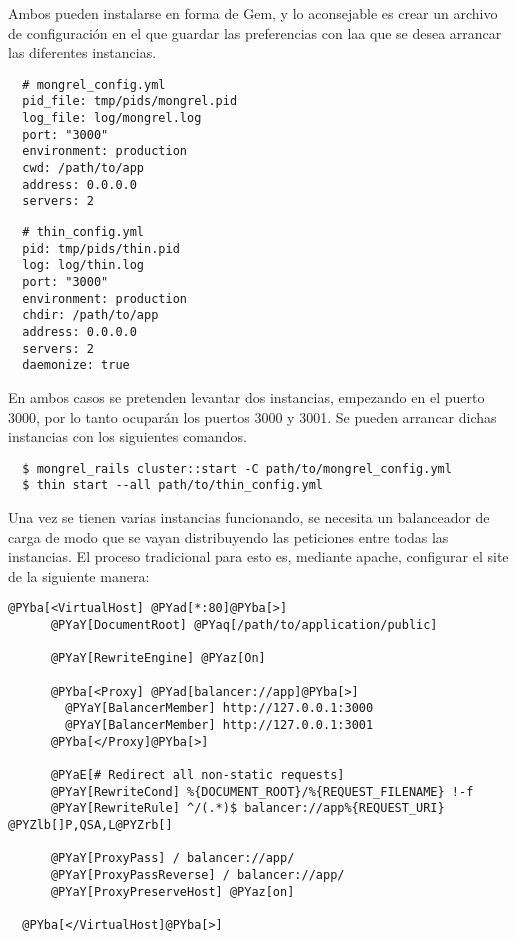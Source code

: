 Ambos pueden instalarse en forma de Gem, y lo aconsejable es crear un archivo de configuración en el que guardar las preferencias con laa que se desea arrancar las diferentes instancias.

\begin{verbatim}
  # mongrel_config.yml
  pid_file: tmp/pids/mongrel.pid
  log_file: log/mongrel.log
  port: "3000"
  environment: production
  cwd: /path/to/app
  address: 0.0.0.0
  servers: 2
\end{verbatim}

\begin{verbatim}
  # thin_config.yml
  pid: tmp/pids/thin.pid
  log: log/thin.log
  port: "3000"
  environment: production
  chdir: /path/to/app
  address: 0.0.0.0
  servers: 2
  daemonize: true
\end{verbatim}

En ambos casos se pretenden levantar dos instancias, empezando en el puerto 3000, por lo tanto ocuparán los puertos 3000 y 3001. Se pueden arrancar dichas instancias con los siguientes comandos.

\begin{verbatim}
  $ mongrel_rails cluster::start -C path/to/mongrel_config.yml
  $ thin start --all path/to/thin_config.yml
\end{verbatim}

Una vez se tienen varias instancias funcionando, se necesita un balanceador de carga de modo que se vayan distribuyendo las peticiones entre todas las instancias. El proceso tradicional para esto es, mediante apache, configurar el site de la siguiente manera:

\begin{Verbatim}[commandchars=@\[\]]
  @PYba[<VirtualHost] @PYad[*:80]@PYba[>]
      @PYaY[DocumentRoot] @PYaq[/path/to/application/public]
      
      @PYaY[RewriteEngine] @PYaz[On]
      
      @PYba[<Proxy] @PYad[balancer://app]@PYba[>]
        @PYaY[BalancerMember] http://127.0.0.1:3000
        @PYaY[BalancerMember] http://127.0.0.1:3001
      @PYba[</Proxy]@PYba[>]
      
      @PYaE[# Redirect all non-static requests]
      @PYaY[RewriteCond] %{DOCUMENT_ROOT}/%{REQUEST_FILENAME} !-f
      @PYaY[RewriteRule] ^/(.*)$ balancer://app%{REQUEST_URI} @PYZlb[]P,QSA,L@PYZrb[]

      @PYaY[ProxyPass] / balancer://app/
      @PYaY[ProxyPassReverse] / balancer://app/
      @PYaY[ProxyPreserveHost] @PYaz[on]
      
  @PYba[</VirtualHost]@PYba[>]
\end{Verbatim}


